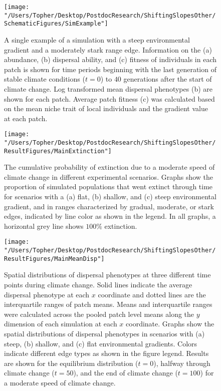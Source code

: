 \documentclass[11pt]{article}
\begin{document}
\begin{figure}[h!]
\texttt{[image: "/Users/Topher/Desktop/PostdocResearch/ShiftingSlopesOther/SchematicFigures/SimExample"]}
\caption{A single example of a simulation with a steep environmental gradient and a moderately stark range edge. Information on the (a) abundance, (b) dispersal ability, and (c) fitness of individuals in each patch is shown for time periods beginning with the last generation of stable climate conditions ($t = 0$) to $40$ generations after the start of climate change. Log transformed mean dispersal phenotypes (b) are shown for each patch. Average patch fitness (c) was calculated based on the mean niche trait of local individuals and the gradient value at each patch.}
\label{fig:SimExample}
\end{figure}

\clearpage

\begin{figure}[h!]
\texttt{[image: "/Users/Topher/Desktop/PostdocResearch/ShiftingSlopesOther/ResultFigures/MainExtinction"]}
\caption{The cumulative probability of extinction due to a moderate speed of climate change in different experimental scenarios. Graphs show the proportion of simulated populations that went extinct through time for scenarios with a (a) flat, (b) shallow, and (c) steep environmental gradient, and in ranges characterized by gradual, moderate, or stark edges, indicated by line color as shown in the legend. In all graphs, a horizontal grey line shows $100\%$ extinction.}
\label{fig:ExtProb}
\end{figure}

\clearpage

\begin{figure}[h!]
\texttt{[image: "/Users/Topher/Desktop/PostdocResearch/ShiftingSlopesOther/ResultFigures/MainMeanDisp"]}
\caption{Spatial distributions of dispersal phenotypes at three different time points during climate change. Solid lines indicate the average dispersal phenotype at each $x$ coordinate and dotted lines are the interquartile ranges of patch means. Means and interquartile ranges were calculated across the pooled patch level means along the $y$ dimension of each simulation at each $x$ coordinate. Graphs show the spatial distributions of dispersal phenotypes in scenarios with (a) steep, (b) shallow, and (c) flat environmental gradients. Colors indicate different edge types as shown in the figure legend. Results are shown for the equilibrium distribution ($t = 0$), halfway through climate change ($t = 50$), and the end of climate change ($t = 100$) for a moderate speed of climate change.}
\label{fig:MeanDisp}
\end{figure}
\end{document}
